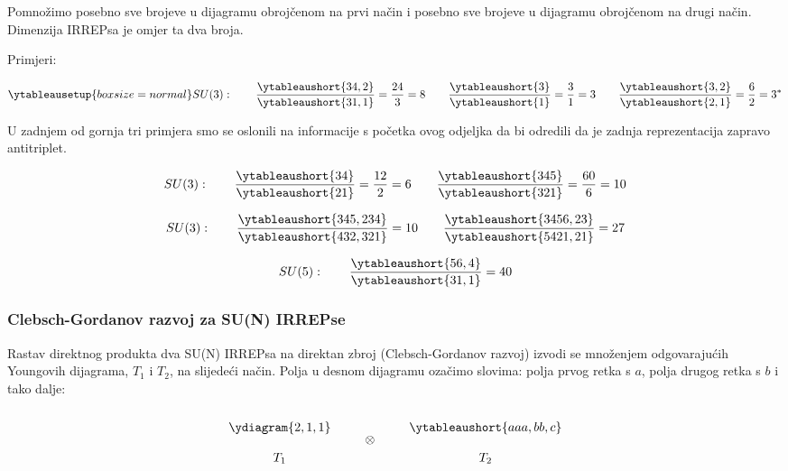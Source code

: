 Pomnožimo posebno sve brojeve u dijagramu obrojčenom na prvi način i
posebno sve brojeve u dijagramu obrojčenom na drugi način. Dimenzija
IRREPsa je omjer ta dva broja.

Primjeri:

\begin{displaymath}
\ytableausetup{boxsize=normal}
SU(3): \qquad \frac{\ytableaushort{34,2}}{\ytableaushort{31,1}} = \frac{24}{3}= 8
\qquad
\frac{\ytableaushort{3}}{\ytableaushort{1}} = \frac{3}{1}= 3
\qquad
\frac{\ytableaushort{3,2}}{\ytableaushort{2,1}} = \frac{6}{2}= 3^*
\end{displaymath}

U zadnjem od gornja tri primjera smo se oslonili na informacije s
početka ovog odjeljka da bi odredili da je zadnja reprezentacija zapravo
antitriplet.

\begin{displaymath}
SU(3): \qquad \frac{\ytableaushort{34}}{\ytableaushort{21}} = \frac{12}{2}= 6
\qquad
\frac{\ytableaushort{345}}{\ytableaushort{321}} = \frac{60}{6}= 10
\end{displaymath}

\begin{displaymath}
SU(3): \qquad \frac{\ytableaushort{345,234}}{\ytableaushort{432,321}} = 10
 \qquad 
\frac{\ytableaushort{3456,23}}{\ytableaushort{5421,21}} = 27
\end{displaymath}

\begin{displaymath}
SU(5): \qquad \frac{\ytableaushort{56,4}}{\ytableaushort{31,1}} = 40
\end{displaymath}

\subsubsection{Clebsch-Gordanov razvoj za SU(N) IRREPse}

Rastav direktnog produkta dva SU(N) IRREPsa na direktan zbroj
(Clebsch-Gordanov razvoj) izvodi se množenjem odgovarajućih
Youngovih dijagrama, $T_1$ i $T_2$, na slijedeći način. Polja u desnom
dijagramu ozačimo slovima: polja prvog retka
s $a$, polja drugog retka s $b$ i tako dalje:

\begin{displaymath}
\renewcommand{\arraystretch}{2}
\begin{array}{c}
\ydiagram{2,1,1} \\ T_1
\end{array}
 \qquad \otimes \qquad 
\begin{array}{c}
\ytableaushort{aaa,bb,c} \\ T_2
\end{array}
\end{displaymath}

